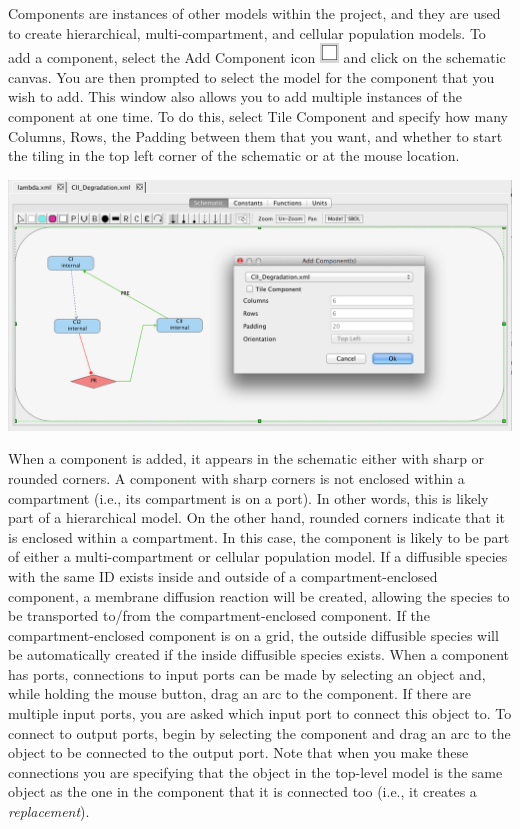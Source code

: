 \documentclass[titlepage,11pt]{article}
\begin{document}
\noindent
Components are instances of other models within the project, and they are used to create hierarchical, multi-compartment, and cellular population models.  To add a component, select the Add Component icon \includegraphics{../gui/icons/modelview/add_component_selected} and click on the schematic canvas.  You are then prompted to select the model for the component that you wish to add.  This window also allows you to add multiple instances of the component at one time.  To do this, select Tile Component and specify how many Columns, Rows, the Padding between them that you want, and whether to start the tiling in the top left corner of the schematic or at the mouse location.  

\begin{center}
\includegraphics[width=160mm]{screenshots/addComponent}
\end{center}

When a component is added, it appears in the schematic either with sharp or rounded corners.  A component with sharp corners is not enclosed within a compartment (i.e., its compartment is on a port).  In other words, this is likely part of a hierarchical model.  On the other hand, rounded corners indicate that it is enclosed within a compartment.  In this case, the component is likely to be part of either a multi-compartment or cellular population model.  If a diffusible species with the same ID exists inside and outside of a compartment-enclosed component, a membrane diffusion reaction will be created, allowing the species to be transported to/from the compartment-enclosed component.  If the compartment-enclosed component is on a grid, the outside diffusible species will be automatically created if the inside diffusible species exists.  
When a component has ports, connections to input ports can be made by selecting an object and, while holding the mouse button, drag an arc to the component.  If there are multiple input ports, you are asked which input port to connect this object to.  To connect to output ports, begin by selecting the component and drag an arc to the object to be connected to the output port.  Note that when you make these connections you are specifying that the object in the top-level model is the same object as the one in the component that it is connected too (i.e., it creates a \emph{replacement}).    
\end{document}
